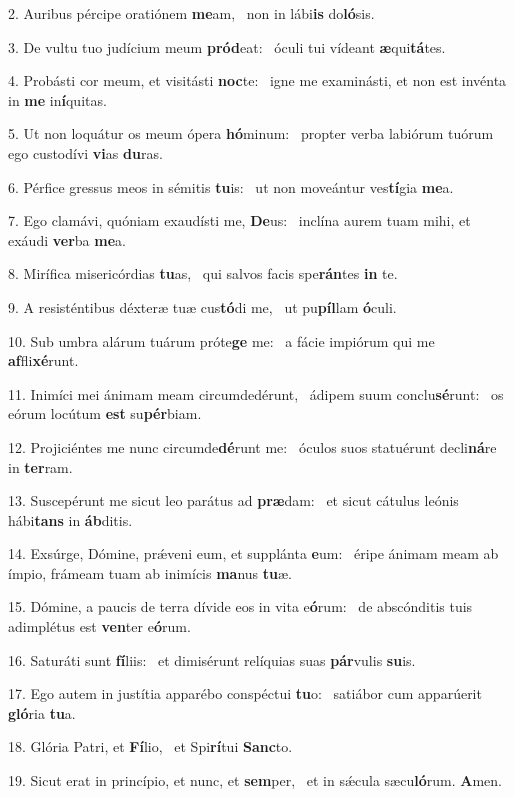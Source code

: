 2. Auribus pércipe oratiónem \textbf{me}am, \ast\  non in lábi\textbf{is} do\textbf{ló}sis.\

3. De vultu tuo judícium meum \textbf{pród}eat: \ast\  óculi tui vídeant \textbf{æ}qui\textbf{tá}tes.\

4. Probásti cor meum, et visitásti \textbf{noc}te: \ast\  igne me examinásti, et non est invénta in \textbf{me} in\textbf{í}quitas.\

5. Ut non loquátur os meum ópera \textbf{hó}minum: \ast\  propter verba labiórum tuórum ego custodívi \textbf{vi}as \textbf{du}ras.\

6. Pérfice gressus meos in sémitis \textbf{tu}is: \ast\  ut non moveántur ves\textbf{tí}gia \textbf{me}a.\

7. Ego clamávi, quóniam exaudísti me, \textbf{De}us: \ast\  inclína aurem tuam mihi, et exáudi \textbf{ver}ba \textbf{me}a.\

8. Mirífica misericórdias \textbf{tu}as, \ast\  qui salvos facis spe\textbf{rán}tes \textbf{in} te.\

9. A resisténtibus déxteræ tuæ cus\textbf{tó}di me, \ast\  ut pu\textbf{píl}lam \textbf{ó}culi.\

10. Sub umbra alárum tuárum próte\textbf{ge} me: \ast\  a fácie impiórum qui me \textbf{af}fli\textbf{xé}runt.\

11. Inimíci mei ánimam meam circumdedérunt, \dag\  ádipem suum conclu\textbf{sé}runt: \ast\  os eórum locútum \textbf{est} su\textbf{pér}biam.\

12. Projiciéntes me nunc circumde\textbf{dé}runt me: \ast\  óculos suos statuérunt decli\textbf{ná}re in \textbf{ter}ram.\

13. Suscepérunt me sicut leo parátus ad \textbf{præ}dam: \ast\  et sicut cátulus leónis hábi\textbf{tans} in \textbf{áb}ditis.\

14. Exsúrge, Dómine, prǽveni eum, et supplánta \textbf{e}um: \ast\  éripe ánimam meam ab ímpio, frámeam tuam ab inimícis \textbf{ma}nus \textbf{tu}æ.\

15. Dómine, a paucis de terra dívide eos in vita e\textbf{ó}rum: \ast\  de abscónditis tuis adimplétus est \textbf{ven}ter e\textbf{ó}rum.\

16. Saturáti sunt \textbf{fí}liis: \ast\  et dimisérunt relíquias suas \textbf{pár}vulis \textbf{su}is.\

17. Ego autem in justítia apparébo conspéctui \textbf{tu}o: \ast\  satiábor cum apparúerit \textbf{gló}ria \textbf{tu}a.\

18. Glória Patri, et \textbf{Fí}lio, \ast\  et Spi\textbf{rí}tui \textbf{Sanc}to.\

19. Sicut erat in princípio, et nunc, et \textbf{sem}per, \ast\  et in sǽcula sæcu\textbf{ló}rum. \textbf{A}men.\

